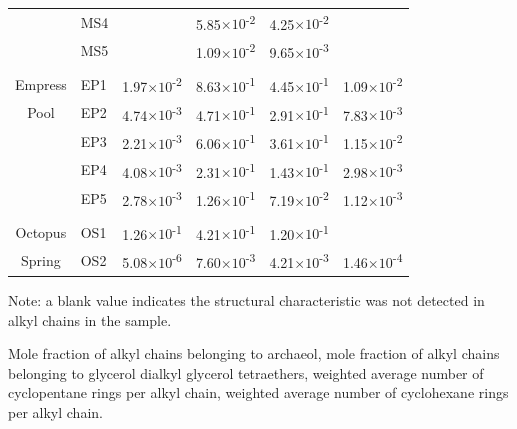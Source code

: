{\begin{table}
\begin{threeparttable}
\begin{tabular}{clllcc}
      & MS4   &       & 5.85$\times 10$\textsuperscript{-2} & 4.25$\times 10$\textsuperscript{-2} &  \\
      & MS5   &       & 1.09$\times 10$\textsuperscript{-2} & 9.65$\times 10$\textsuperscript{-3} &  \\
      &       &       &       &       &  \\
Empress & EP1   & 1.97$\times 10$\textsuperscript{-2} & 8.63$\times 10$\textsuperscript{-1} & 4.45$\times 10$\textsuperscript{-1} & 1.09$\times 10$\textsuperscript{-2} \\
Pool  & EP2   & 4.74$\times 10$\textsuperscript{-3} & 4.71$\times 10$\textsuperscript{-1} & 2.91$\times 10$\textsuperscript{-1} & 7.83$\times 10$\textsuperscript{-3} \\
      & EP3   & 2.21$\times 10$\textsuperscript{-3} & 6.06$\times 10$\textsuperscript{-1} & 3.61$\times 10$\textsuperscript{-1} & 1.15$\times 10$\textsuperscript{-2} \\
      & EP4   & 4.08$\times 10$\textsuperscript{-3} & 2.31$\times 10$\textsuperscript{-1} & 1.43$\times 10$\textsuperscript{-1} & 2.98$\times 10$\textsuperscript{-3} \\
      & EP5   & 2.78$\times 10$\textsuperscript{-3} & 1.26$\times 10$\textsuperscript{-1} & 7.19$\times 10$\textsuperscript{-2} & 1.12$\times 10$\textsuperscript{-3} \\
      &       &       &       &       &  \\
Octopus & OS1   & 1.26$\times 10$\textsuperscript{-1} & 4.21$\times 10$\textsuperscript{-1} & 1.20$\times 10$\textsuperscript{-1} &  \\
Spring & OS2   & 5.08$\times 10$\textsuperscript{-6} & 7.60$\times 10$\textsuperscript{-3} & 4.21$\times 10$\textsuperscript{-3} & 1.46$\times 10$\textsuperscript{-4} \\
\bottomrule
\end{tabular}%

  
  \begin{tablenotes}
    \item Note: a blank value indicates the structural characteristic was not detected in alkyl chains in the sample.
    
     Mole fraction of alkyl chains belonging to archaeol,
     mole fraction of alkyl chains belonging to glycerol dialkyl glycerol tetraethers,
     weighted average number of cyclopentane rings per alkyl chain,
     weighted average number of cyclohexane rings per alkyl chain.
    \item
        
  \end{tablenotes}
  
  \label{tab:leftover_props}
  \end{threeparttable}
\end{table}
\setcounter{tabcounter}{0} %
\doublespace
\clearpage
}

